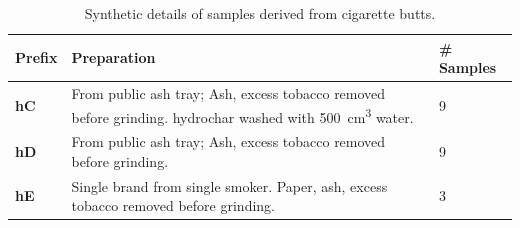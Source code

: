\begin{table}[ht!]
    \caption{Synthetic details of samples derived from cigarette butts.}
    \label{tb:cb_synthesis}
    \begin{tabularx}{\textwidth}{lXl}
        \toprule
            \textbf{Prefix} & \textbf{Preparation}  & \textbf{\# Samples} \\ 
        \midrule
            \textbf{hC}     & From public ash tray; Ash, excess tobacco removed before grinding. \Gls{hydrochar} washed with \qty{500}{\cm\cubed} water.  & 9              \\
            \textbf{hD}     &  From public ash tray; Ash, excess tobacco removed before grinding. & 9             \\
            \textbf{hE}     & Single brand from single smoker. Paper, ash, excess tobacco removed before grinding.  & 3              \\
        \bottomrule
    \end{tabularx}%
\end{table}

